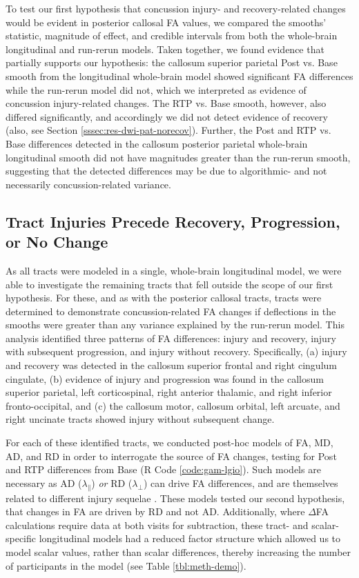 \documentclass[]{imag-ms-template}
\begin{document}
To test our first hypothesis that concussion injury- and recovery-related changes would be evident in posterior callosal FA values, we compared the smooths' statistic, magnitude of effect, and credible intervals from both the whole-brain longitudinal and run-rerun models. Taken together, we found evidence that partially supports our hypothesis: the callosum superior parietal Post vs. Base smooth from the longitudinal whole-brain model showed significant FA differences while the run-rerun model did not, which we interpreted as evidence of concussion injury-related changes. The RTP vs. Base smooth, however, also differed significantly, and accordingly we did not detect evidence of recovery (also, see Section \ref{sssec:res-dwi-pat-norecov}). Further, the Post and RTP vs. Base differences detected in the callosum posterior parietal whole-brain longitudinal smooth did not have magnitudes greater than the run-rerun smooth, suggesting that the detected differences may be due to algorithmic- and not necessarily concussion-related variance.


\subsection{Tract Injuries Precede Recovery, Progression, or No Change}
\label{ssec:res-dwi-pat}
As all tracts were modeled in a single, whole-brain longitudinal model, we were able to investigate the remaining tracts that fell outside the scope of our first hypothesis. For these, and as with the posterior callosal tracts, tracts were determined to demonstrate concussion-related FA changes if deflections in the smooths were greater than any variance explained by the run-rerun model. This analysis identified three patterns of FA differences: injury and recovery, injury with subsequent progression, and injury without recovery. Specifically, (a) injury and recovery was detected in the callosum superior frontal and right cingulum cingulate, (b) evidence of injury and progression was found in the callosum superior parietal, left corticospinal, right anterior thalamic, and right inferior fronto-occipital, and (c) the callosum motor, callosum orbital, left arcuate, and right uncinate tracts showed injury without subsequent change.

For each of these identified tracts, we conducted post-hoc models of FA, MD, AD, and RD in order to interrogate the source of FA changes, testing for Post and RTP differences from Base (R Code \ref{code:gam-lgio}). Such models are necessary as AD ($\lambda_\parallel$) \textit{or} RD ($\lambda_\perp$) can drive FA differences, and are themselves related to different injury sequelae \parencite{winklewski2018UnderstandingPhysiopathologyAxial}. These models tested our second hypothesis, that changes in FA are driven by RD and not AD. Additionally, where $\Delta$FA calculations require data at both visits for subtraction, these tract- and scalar-specific longitudinal models had a reduced factor structure which allowed us to model scalar values, rather than scalar differences, thereby increasing the number of participants in the model (see Table \ref{tbl:meth-demo}).
\end{document}
